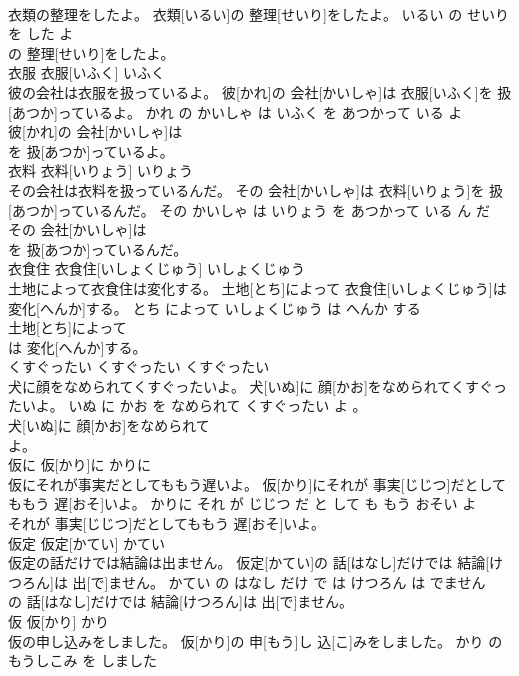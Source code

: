 \documentclass[8pt]{extreport}
\begin{document}
\begin{CJK}{UTF8}{min}
\\	衣類の整理をしたよ。	衣類[いるい]の 整理[せいり]をしたよ。	いるい の せいり を した よ	
\\	の 整理[せいり]をしたよ。			
\\	衣服	衣服[いふく]	いふく	
\\	彼の会社は衣服を扱っているよ。	彼[かれ]の 会社[かいしゃ]は 衣服[いふく]を 扱[あつか]っているよ。	かれ の かいしゃ は いふく を あつかって いる よ	
\\	彼[かれ]の 会社[かいしゃ]は
\\	を 扱[あつか]っているよ。			
\\	衣料	衣料[いりょう]	いりょう	
\\	その会社は衣料を扱っているんだ。	その 会社[かいしゃ]は 衣料[いりょう]を 扱[あつか]っているんだ。	その かいしゃ は いりょう を あつかって いる ん だ	
\\	その 会社[かいしゃ]は
\\	を 扱[あつか]っているんだ。			
\\	衣食住	衣食住[いしょくじゅう]	いしょくじゅう	
\\	土地によって衣食住は変化する。	土地[とち]によって 衣食住[いしょくじゅう]は 変化[へんか]する。	とち によって いしょくじゅう は へんか する	
\\	土地[とち]によって
\\	は 変化[へんか]する。			
\\	くすぐったい	くすぐったい	くすぐったい	
\\	犬に顔をなめられてくすぐったいよ。	犬[いぬ]に 顔[かお]をなめられてくすぐったいよ。	いぬ に かお を なめられて くすぐったい よ 。	
\\	犬[いぬ]に 顔[かお]をなめられて
\\	よ。			
\\	仮に	仮[かり]に	かりに	
\\	仮にそれが事実だとしてももう遅いよ。	仮[かり]にそれが 事実[じじつ]だとしてももう 遅[おそ]いよ。	かりに それ が じじつ だ と して も もう おそい よ	
\\	それが 事実[じじつ]だとしてももう 遅[おそ]いよ。			
\\	仮定	仮定[かてい]	かてい	
\\	仮定の話だけでは結論は出ません。	仮定[かてい]の 話[はなし]だけでは 結論[けつろん]は 出[で]ません。	かてい の はなし だけ で は けつろん は でません	
\\	の 話[はなし]だけでは 結論[けつろん]は 出[で]ません。			
\\	仮	仮[かり]	かり	
\\	仮の申し込みをしました。	仮[かり]の 申[もう]し 込[こ]みをしました。	かり の もうしこみ を しました	

\end{CJK}
\end{document}
